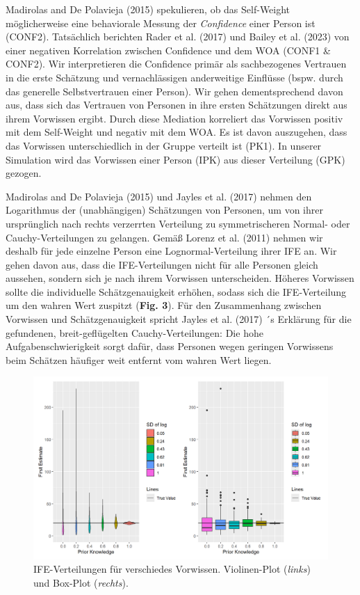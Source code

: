\documentclass[
  man,mask,floatsintext]{apa6}
\begin{document}
Madirolas and De Polavieja (2015) spekulieren, ob das Self-Weight möglicherweise eine behaviorale Messung der \emph{Confidence} einer Person ist (CONF2). Tatsächlich berichten Rader et al. (2017) und Bailey et al. (2023) von einer negativen Korrelation zwischen Confidence und dem WOA (CONF1 \& CONF2). Wir interpretieren die Confidence primär als sachbezogenes Vertrauen in die erste Schätzung und vernachlässigen anderweitige Einflüsse (bspw. durch das generelle Selbstvertrauen einer Person). Wir gehen dementsprechend davon aus, dass sich das Vertrauen von Personen in ihre ersten Schätzungen direkt aus ihrem Vorwissen ergibt. Durch diese Mediation korreliert das Vorwissen positiv mit dem Self-Weight und negativ mit dem WOA. Es ist davon auszugehen, dass das Vorwissen unterschiedlich in der Gruppe verteilt ist (PK1). In unserer Simulation wird das Vorwissen einer Person (IPK) aus dieser Verteilung (GPK) gezogen.

Madirolas and De Polavieja (2015) und Jayles et al. (2017) nehmen den Logarithmus der (unabhängigen) Schätzungen von Personen, um von ihrer ursprünglich nach rechts verzerrten Verteilung zu symmetrischeren Normal- oder Cauchy-Verteilungen zu gelangen. Gemäß Lorenz et al. (2011) nehmen wir deshalb für jede einzelne Person eine Lognormal-Verteilung ihrer IFE an. Wir gehen davon aus, dass die IFE-Verteilungen nicht für alle Personen gleich aussehen, sondern sich je nach ihrem Vorwissen unterscheiden. Höheres Vorwissen sollte die individuelle Schätzgenauigkeit erhöhen, sodass sich die IFE-Verteilung um den wahren Wert zuspitzt (\textbf{Fig. 3}). Für den Zusammenhang zwischen Vorwissen und Schätzgenauigkeit spricht Jayles et al. (2017) ´s Erklärung für die gefundenen, breit-geflügelten Cauchy-Verteilungen: Die hohe Aufgabenschwierigkeit sorgt dafür, dass Personen wegen geringen Vorwissens beim Schätzen häufiger weit entfernt vom wahren Wert liegen.



\begin{figure}
\centering
\includegraphics{Abbildungen/Plot_PK_FE.png}
\caption{\label{fig:my-figure3}IFE-Verteilungen für verschiedes Vorwissen. Violinen-Plot (\emph{links}) und Box-Plot (\emph{rechts}).}
\end{figure}
\end{document}
